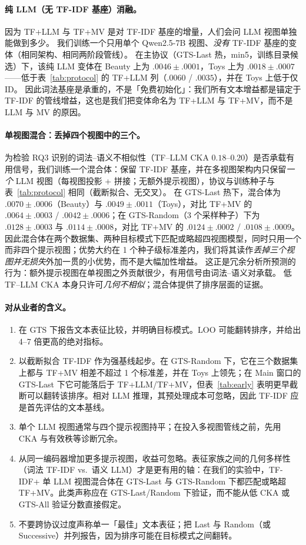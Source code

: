 \documentclass[sigconf,natbib=true,anonymous]{acmart}
\newcommand{\tfidf}{\textsc{TF-IDF}\xspace}
\newcommand{\llm}{\textsc{LLM}\xspace}
\newcommand{\tfllm}{\textsc{TF+LLM}\xspace}
\newcommand{\tfmv}{\textsc{TF+MV}\xspace}
\begin{document}
\paragraph{纯 LLM（无 \tfidf 基座）消融。}
因为 \tfllm 与 \tfmv 是对 \tfidf 基座的增量，人们会问 LLM 视图单独能做到多少。
我们训练一个只用单个 Qwen2.5-7B 视图、\emph{没有} \tfidf 基座的变体（相同架构、相同两阶段管线）。
在主协议（GTS-Last 热，min5，训练目录候选）下，该纯 LLM 变体在 Beauty 上为 $.0046\pm.0001$，Toys 上为 $.0018\pm.0007$——低于表~\ref{tab:protocol} 的 \tfllm 列（$.0060$ / $.0035$），并在 Toys 上低于仅 ID。
因此词法基座是承重的，不是「免费初始化」：我们所有文本增益都是锚定于 \tfidf 的管线增益，这也是我们把变体命名为 \tfllm 与 \tfmv，而不是 LLM 与 MV 的原因。

\paragraph{单视图混合：丢掉四个视图中的三个。}
为检验 RQ3 识别的词法--语义不相似性（TF--LLM CKA $0.18$--$0.20$）是否承载有用信号，我们训练一个混合体：保留 \tfidf 基座，并在多视图架构内只保留\emph{一个} LLM 视图（每视图投影 + 拼接；无额外提示视图），协议与训练种子与表~\ref{tab:protocol} 相同（截断拟合、无交叉）。
在 GTS-Last 热下，混合体为 $.0070\pm.0006$（Beauty）与 $.0049\pm.0011$（Toys），对比 \tfmv 的 $.0064\pm.0003$ / $.0042\pm.0006$；在 GTS-Random（3 个采样种子）下为 $.0128\pm.0003$ 与 $.0114\pm.0008$，对比 \tfmv 的 $.0124\pm.0002$ / $.0108\pm.0009$。
因此混合体在两个数据集、两种目标模式下匹配或略超四视图模型，同时只用一个而非四个提示视图；优势大约在 1 个种子级标准差内，我们将其读作\emph{丢掉三个视图并无损失}外加一贯的小优势，而不是大幅加性增益。
这正是冗余分析所预测的行为：额外提示视图在单视图之外贡献很少，有用信号由词法--语义对承载。
低 TF--LLM CKA 本身只许可\emph{几何不相似}；混合体提供了排序层面的证据。

\paragraph{对从业者的含义。}
\begin{enumerate}[leftmargin=*,itemsep=2pt]
\item 在 GTS 下报告文本表征比较，并明确目标模式。LOO 可能翻转排序，并给出 4--7 倍更高的绝对指标。
\item 以截断拟合 \tfidf 作为强基线起步。在 GTS-Random 下，它在三个数据集上都与 \tfmv 相差不超过 1 个标准差，并在 Toys 上领先；在 Main 窗口的 GTS-Last 下它可能落后于 \tfllm/\tfmv，但表~\ref{tab:early} 表明更早截断可以翻转该排序。相对 LLM 推理，其预处理成本可忽略，因此 TF-IDF 应是首先评估的文本基线。
\item 单个 \llm 视图通常与四个提示视图持平；在投入多视图管线之前，先用 CKA 与有效秩等诊断冗余。
\item 从同一编码器增加更多提示视图，收益可忽略。表征家族之间的几何多样性（词法 \tfidf vs.\ 语义 \llm）才是更有用的轴：在我们的实验中，\tfidf + 单 LLM 视图混合体在 GTS-Last 与 GTS-Random 下都匹配或略超 \tfmv。此类声称应在 GTS-Last/Random 下验证，而不能从低 CKA 或 GTS-All 验证分数直接假定。
\item 不要跨协议过度声称单一「最佳」文本表征；把 Last 与 Random（或 Successive）并列报告，因为排序可能在目标模式之间翻转。
\end{enumerate}
\end{document}
